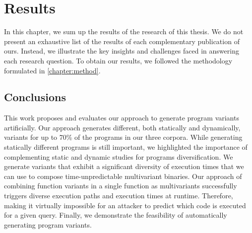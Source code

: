 \chapter{Results} 

In this chapter, we sum up the results of the research of this thesis. We do not present an exhaustive list of the results of each complementary publication of ours. Instead, we illustrate the key insights and challenges faced in answering each research question.  To obtain our results, we followed the methodology formulated in \autoref{chapter:method}.







\section{Conclusions}

This work proposes and evaluates our approach to generate \wasm program variants artificially. Our approach generates different, both statically and dynamically, variants for up to 70\% of the programs in our three corpora. While generating statically different programs is still important, we highlighted the importance of complementing static and dynamic studies for programs diversification. We generate variants that exhibit a significant diversity of execution times that we can use to compose time-unpredictable multivariant binaries. Our approach of combining function variants in a single function as multivariants successfully triggers diverse execution paths and execution times at runtime. Therefore, making it virtually impossible for an attacker to predict which code is executed for a given query. Finally, we demonstrate the feasibility of automatically generating \wasm program variants.

